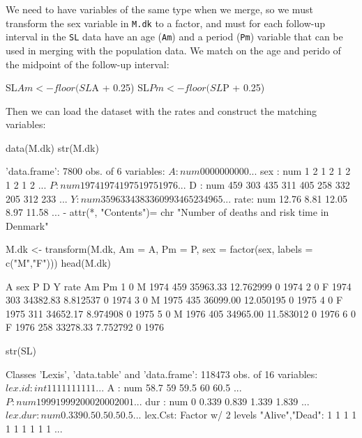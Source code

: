 \begin{enumerate}[resume]
  We need to have variables of the same type when we merge, so we must
  transform the sex variable in \texttt{M.dk} to a factor, and must
  for each follow-up interval in the \texttt{SL} data have an age
  (\texttt{Am}) and a period (\texttt{Pm}) variable that can be used
  in merging with the population data. We match on the age and perido
  of the midpoint of the follow-up interval:
\begin{Schunk}
\begin{Sinput}
 SL$Am <- floor(SL$A + 0.25)
 SL$Pm <- floor(SL$P + 0.25)
\end{Sinput}
\end{Schunk}
Then we can load the dataset with the rates and construct the matching
variables:
\begin{Schunk}
\begin{Sinput}
 data(M.dk)
 str(M.dk)
\end{Sinput}
\begin{Soutput}
'data.frame':	7800 obs. of  6 variables:
 $ A   : num  0 0 0 0 0 0 0 0 0 0 ...
 $ sex : num  1 2 1 2 1 2 1 2 1 2 ...
 $ P   : num  1974 1974 1975 1975 1976 ...
 $ D   : num  459 303 435 311 405 258 332 205 312 233 ...
 $ Y   : num  35963 34383 36099 34652 34965 ...
 $ rate: num  12.76 8.81 12.05 8.97 11.58 ...
 - attr(*, "Contents")= chr "Number of deaths and risk time in Denmark"
\end{Soutput}
\begin{Sinput}
 M.dk <- transform(M.dk, Am = A,
                         Pm = P,
                        sex = factor(sex, labels = c("M","F")))
 head(M.dk)
\end{Sinput}
\begin{Soutput}
  A sex    P   D        Y      rate Am   Pm
1 0   M 1974 459 35963.33 12.762999  0 1974
2 0   F 1974 303 34382.83  8.812537  0 1974
3 0   M 1975 435 36099.00 12.050195  0 1975
4 0   F 1975 311 34652.17  8.974908  0 1975
5 0   M 1976 405 34965.00 11.583012  0 1976
6 0   F 1976 258 33278.33  7.752792  0 1976
\end{Soutput}
\begin{Sinput}
 str(SL)
\end{Sinput}
\begin{Soutput}
Classes 'Lexis', 'data.table' and 'data.frame':	118473 obs. of  16 variables:
 $ lex.id : int  1 1 1 1 1 1 1 1 1 1 ...
 $ A      : num  58.7 59 59.5 60 60.5 ...
 $ P      : num  1999 1999 2000 2000 2001 ...
 $ dur    : num  0 0.339 0.839 1.339 1.839 ...
 $ lex.dur: num  0.339 0.5 0.5 0.5 0.5 ...
 $ lex.Cst: Factor w/ 2 levels "Alive","Dead": 1 1 1 1 1 1 1 1 1 1 ...

\end{Soutput}
\end{Schunk}
\end{enumerate}
